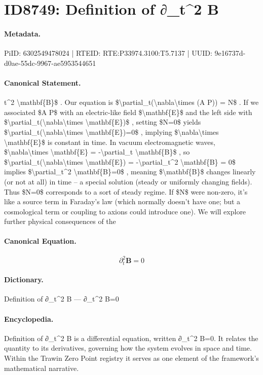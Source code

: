 \section*{ID8749: Definition of ∂\_t\textasciicircum{}2 B}
\paragraph{Metadata.}
PiID: 6302549478024 | RTEID: RTE:P33974.3100:T5.7137 | UUID: 9e16737d-d0ae-55dc-9967-ae5953544651

\paragraph{Canonical Statement.}
t\textasciicircum{}2 \textbackslash{}mathbf\{B\}\$ . Our equation is \$\textbackslash{}partial\_t(\textbackslash{}nabla\textbackslash{}times (A P)) = N\$ . If we associated \$A P\$ with an electric-like field \$\textbackslash{}mathbf\{E\}\$ and the left side with \$\textbackslash{}partial\_t(\textbackslash{}nabla\textbackslash{}times \textbackslash{}mathbf\{E\})\$ , setting \$N=0\$ yields \$\textbackslash{}partial\_t(\textbackslash{}nabla\textbackslash{}times \textbackslash{}mathbf\{E\})=0\$ , implying \$\textbackslash{}nabla\textbackslash{}times \textbackslash{}mathbf\{E\}\$ is constant in time. In vacuum electromagnetic waves, \$\textbackslash{}nabla\textbackslash{}times \textbackslash{}mathbf\{E\} = -\textbackslash{}partial\_t \textbackslash{}mathbf\{B\}\$ , so \$\textbackslash{}partial\_t(\textbackslash{}nabla\textbackslash{}times \textbackslash{}mathbf\{E\}) = -\textbackslash{}partial\_t\textasciicircum{}2 \textbackslash{}mathbf\{B\} = 0\$ implies \$\textbackslash{}partial\_t\textasciicircum{}2 \textbackslash{}mathbf\{B\}=0\$ , meaning \$\textbackslash{}mathbf\{B\}\$ changes linearly (or not at all) in time – a special solution (steady or uniformly changing fields). Thus \$N=0\$ corresponds to a sort of steady regime. If \$N\$ were non-zero, it’s like a source term in Faraday’s law (which normally doesn’t have one; but a cosmological term or coupling to axions could introduce one). We will explore further physical consequences of the

\paragraph{Canonical Equation.}
\[
\partial_t^2 \mathbf{B}=0
\]

\paragraph{Dictionary.}
Definition of ∂\_t\textasciicircum{}2 B — ∂\_t\textasciicircum{}2 B=0

\paragraph{Encyclopedia.}
Definition of ∂\_t\textasciicircum{}2 B is a differential equation, written ∂\_t\textasciicircum{}2 B=0. It relates the quantity to its derivatives, governing how the system evolves in space and time. Within the Trawin Zero Point registry it serves as one element of the framework's mathematical narrative.
